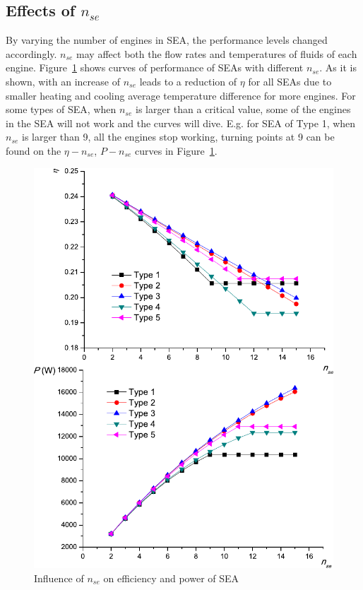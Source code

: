 \subsection{Effects of $n_{se}$}

By varying the number of engines in SEA, the performance levels changed accordingly. $n_{se}$ may affect both the flow rates and temperatures of fluids of each engine. Figure~\ref{fig:n_se} shows curves of performance of SEAs with different $n_{se}$. As it is shown, with an increase of $n_{se}$ leads to a reduction of $\eta$ for all SEAs due to smaller heating and cooling average temperature difference for more engines. For some types of SEA, when $n_{se}$ is larger than a critical value, some of the engines in the SEA will not work and the curves will dive. E.g. for SEA of Type 1, when $n_{se}$ is larger than 9, all the engines stop working, turning points at 9 can be found on the $\eta-n_{se}$, $P-n_{se}$ curves in Figure~\ref{fig:n_se}.

\noindent \begin{figure}[htbp]
\begin{center}
	\includegraphics[width = 0.7\columnwidth]{fig/n_se}
	\caption{Influence of $n_{se}$ on efficiency and power of SEA}
	\label{fig:n_se}
\end{center}
\end{figure}

